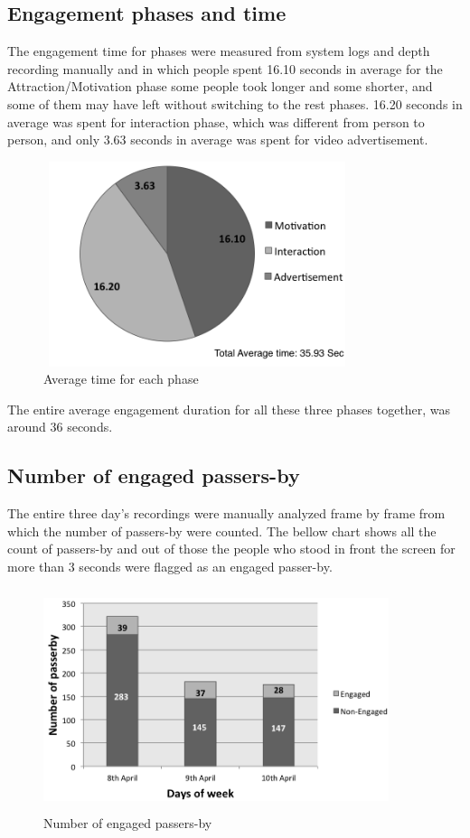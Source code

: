 \subsection{Engagement phases and time}
The engagement time for phases were measured from system logs and depth recording manually and in which people spent 16.10 seconds in average for the Attraction/Motivation phase some people took longer and some shorter, and some of them may have left without switching to the rest phases. 16.20 seconds in average was spent for interaction phase, which was different from person to person, and only 3.63 seconds in average was spent for video advertisement.

\begin{figure}[H]
    \centering
    \includegraphics[width=90mm,height=60mm]{Figures/9/avg_phases}
    \caption{Average time for each phase}%
    \label{fig:newbodyaveragephases}%
\end{figure}

The entire average engagement duration for all these three phases together, was around 36 seconds.

\subsection{Number of engaged passers-by}
The entire three day’s recordings were manually analyzed frame by frame from which the number of passers-by were counted. The bellow chart shows all the count of passers-by and out of those the people who stood in front the screen for more than 3 seconds were flagged as an engaged passer-by. 

\begin{figure}[H]
    \centering
    \includegraphics[width=0.9\textwidth,height=6.5cm]{Figures/9/newbody_inter_engage_day}
    \caption{Number of engaged passers-by}%
    \label{fig:newbodyengagedandengagedby}%
\end{figure}


